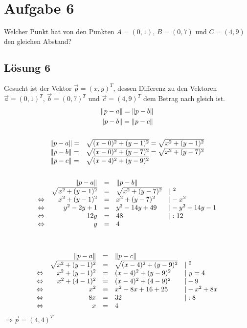\section{Aufgabe 6}

Welcher Punkt hat von den Punkten $\displaystyle A=( 0,1)$, $\displaystyle B=( 0,7)$ und $\displaystyle C=( 4,9)$ den gleichen Abstand? 



\subsection{Lösung 6}

Gesucht ist der Vektor $\displaystyle \vec{p} =( x,y)^{T}$, dessen Differenz zu den Vektoren $\displaystyle \vec{a} =( 0,1)^{T}$, $\displaystyle \vec{b} =( 0,7)^{T}$ und $\displaystyle \vec{c} =( 4,9)^{T}$ dem Betrag nach gleich ist.
\begin{gather*}
  \| p-a\| =\| p-b\| \\
  \| p-b\| =\| p-c\| \\
  \\
  \begin{array}{ c l }
    \| p-a\| = & \sqrt{( x-0)^{2} +( y-1)^{2}} =\sqrt{x^{2} +( y-1)^{2}}\\
    \| p-b\| = & \sqrt{( x-0)^{2} +( y-7)^{2}} =\sqrt{x^{2} +( y-7)^{2}}\\
    \| p-c\| = & \sqrt{( x-4)^{2} +( y-9)^{2}}
  \end{array}\\
  \\
  \begin{array}{ c r c l l }
    & \| p-a\|  & = & \| p-b\|  & \\
    & \sqrt{x^{2} +( y-1)^{2}} & = & \sqrt{x^{2} +( y-7)^{2}} & |^{\ 2}\\
    \Leftrightarrow  & x^{2} +( y-1)^{2} & = & x^{2} +( y-7)^{2} & |-x^{2}\\
    \Leftrightarrow  & y^{2} -2y+1 & = & y^{2} -14y+49 & |-y^{2} +14y-1\\
    \Leftrightarrow  & 12y & = & 48 & |:12\\
    \Leftrightarrow  & y & = & 4 & 
  \end{array}\\
  \\
  \\
  \begin{array}{ c r c l l }
    & \| p-a\|  & = & \| p-c\|  & \\
    & \sqrt{x^{2} +( y-1)^{2}} & = & \sqrt{( x-4)^{2} +( y-9)^{2}} & |\ ^{2}\\
    \Leftrightarrow  & x^{2} +( y-1)^{2} & = & ( x-4)^{2} +( y-9)^{2} & |\ y=4\\
    \Leftrightarrow  & x^{2} +( 4-1)^{2} & = & ( x-4)^{2} +( 4-9)^{2} & |-9\\
    \Leftrightarrow  & x^{2} & = & x^{2} -8x+16+25 & |-x^{2} +8x\\
    \Leftrightarrow  & 8x & = & 32 & |:8\\
    \Leftrightarrow  & x & = & 4 & 
  \end{array}
\end{gather*}
$\displaystyle \Rightarrow $$\displaystyle \vec{p} =( 4,4)^{T}$
